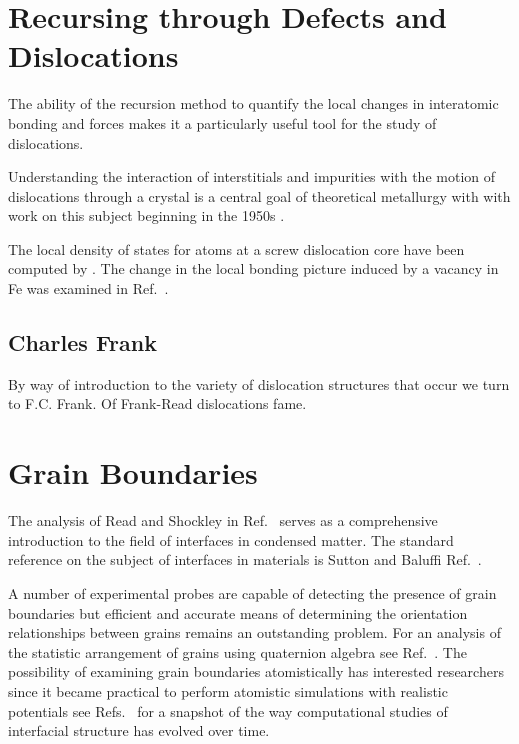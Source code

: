 \section{Recursing through Defects and Dislocations}
The ability of the recursion method to quantify the local changes in interatomic bonding and
forces makes it a particularly useful tool for the study of dislocations. 

Understanding the interaction of interstitials and impurities with the motion of
dislocations through a crystal is a central goal of theoretical metallurgy with
with work on this subject beginning in the 1950s \cite{cochardt55}.

The local density of states for atoms at a screw dislocation core have been computed by \cite{paidar81,masuda81}. 
The change in the local bonding picture induced by a vacancy in Fe was examined in Ref.~\cite{masuda82,ohta87}.

\subsection{Charles Frank}
By way of introduction to the variety of dislocation structures that occur
we turn to F.C. Frank. Of Frank-Read dislocations fame.

\section{Grain Boundaries}
The analysis of Read and Shockley in Ref.~\cite{read50} serves as a comprehensive
introduction to the field of interfaces in condensed matter. The 
standard reference on the subject of interfaces in materials is Sutton and 
Baluffi Ref.~\cite{sutton95}.

A number of experimental probes are capable of detecting the presence of 
grain boundaries but efficient and accurate means of determining 
the orientation relationships between grains remains an outstanding problem.
For an analysis of the statistic arrangement of grains using quaternion
algebra see Ref.~\cite{sutton96}.
The possibility of examining grain boundaries atomistically has interested
researchers since it became practical to perform atomistic simulations
with realistic potentials see Refs.~\cite{bristowe75,wolf83,paxton87,paxton88,paxtonsutton88,
kohyama88,kohyama94,paxton96,rittner96,tschopp07,momida13,du11,du12,mceniry18} for a
snapshot of the way computational studies of interfacial structure 
has evolved over time.

